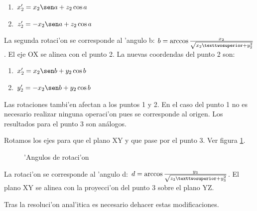 \begin{enumerate}
\item $x_2' = x_2 \sen a + z_2 \cos a$
\item $z_2' = - x_2 \sen a + z_2 \cos a$
\end{enumerate}

La segunda rotaci'on se corresponde al 'angulo b: $b = \arccos {x_2 \over {\sqrt{x_2²+y_2^2}}}$. El eje OX se alinea con el punto 2. La nuevas coordendas del punto 2 son:

\begin{enumerate}
\item $x_2' = x_2 \sen b + y_2 \cos b$
\item $y_2' = - x_2 \sen b + y_2 \cos b$
\end{enumerate}

Las rotaciones tambi'en afectan a los puntos 1 y 2. En el caso del punto 1 no es necesario realizar ninguna operaci'on pues se corresponde al origen. Los resultados para el punto 3 son análogos. \bigskip\newline

Rotamos los ejes para que el plano XY y que pase por el punto 3.
Ver figura \ref{fig:triang5}.

\begin{figure}[h!]
	\begin{center}
     	\end{center}
    	\caption{'Angulos de rotaci'on}\label{fig:triang5}
\end{figure}

La rotaci'on se corresponde al 'angulo d: $d = \arccos {y_3 \over {\sqrt{z_3²+y_3^2}}}$. El plano XY se alinea con la proyecci'on del punto 3 sobre el plano YZ. 

Tras la resoluci'on anal'itica es necesario dehacer estas modificaciones. 

